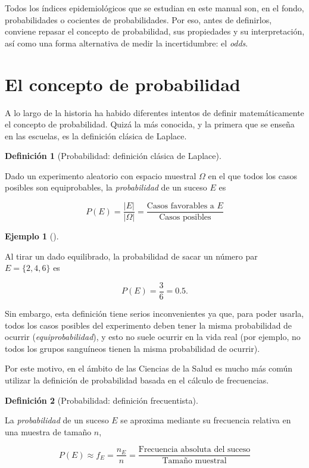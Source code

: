 \documentclass[
  spanish,
  a4paper,
]{scrreport}
\theoremstyle{definition}
\newtheorem{definition}{Definición}[chapter]
\theoremstyle{definition}
\newtheorem{example}{Ejemplo}[chapter]
\theoremstyle{remark}
\begin{document}
Todos los índices epidemiológicos que se estudian en este manual son, en
el fondo, probabilidades o cocientes de probabilidades. Por eso, antes
de definirlos, conviene repasar el concepto de probabilidad, sus
propiedades y su interpretación, así como una forma alternativa de medir
la incertidumbre: el \emph{odds}.

\section{El concepto de probabilidad}\label{el-concepto-de-probabilidad}

A lo largo de la historia ha habido diferentes intentos de definir
matemáticamente el concepto de probabilidad. Quizá la más conocida, y la
primera que se enseña en las escuelas, es la definición clásica de
Laplace.

\begin{definition}[Probabilidad: definición clásica de
Laplace]\protect\hypertarget{def-probabilidad-laplace}{}\label{def-probabilidad-laplace}

Dado un experimento aleatorio con espacio muestral \(\Omega\) en el que
todos los casos posibles son equiprobables, la \emph{probabilidad} de un
suceso \(E\) es

\[P(E)=\frac{|E|}{|\Omega|}=\frac{\mbox{Casos favorables a $E$}}{\mbox{Casos posibles}}\]

\end{definition}

\begin{example}[]\protect\hypertarget{exm-probabilidad-laplace}{}\label{exm-probabilidad-laplace}

Al tirar un dado equilibrado, la probabilidad de sacar un número par
\(E=\{2, 4, 6\}\) es

\[P(E) = \frac{3}{6} = 0.5.\]

\end{example}

Sin embargo, esta definición tiene serios inconvenientes ya que, para
poder usarla, todos los casos posibles del experimento deben tener la
misma probabilidad de ocurrir (\emph{equiprobabilidad}), y esto no suele
ocurrir en la vida real (por ejemplo, no todos los grupos sanguíneos
tienen la misma probabilidad de ocurrir).

Por este motivo, en el ámbito de las Ciencias de la Salud es mucho más
común utilizar la definición de probabilidad basada en el cálculo de
frecuencias.

\begin{definition}[Probabilidad: definición
frecuentista]\protect\hypertarget{def-probabilidad-frecuentista}{}\label{def-probabilidad-frecuentista}

La \emph{probabilidad} de un suceso \(E\) se aproxima mediante su
frecuencia relativa en una muestra de tamaño \(n\),

\[P(E)\approx f_E = \frac{n_E}{n}=\frac{\mbox{Frecuencia absoluta del suceso}}{\mbox{Tamaño muestral}}\]

\end{definition}
\end{document}
